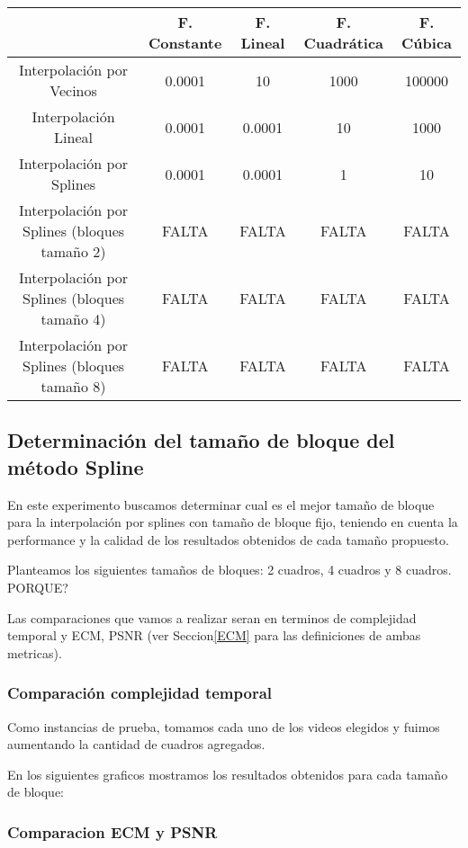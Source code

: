 \begin{table}[H]
    \begin{tabular}{| c | c | c | c | c |}
    \hline
    {} & F. Constante & F. Lineal & F. Cuadrática & F. Cúbica \\ \hline
    Interpolación por Vecinos & 0.0001 & 10 & 1000 & 100000 \\
    Interpolación Lineal & 0.0001 & 0.0001 & 10 & 1000 \\
    Interpolación por Splines & 0.0001 & 0.0001 & 1 & 10 \\
    Interpolación por Splines (bloques tamaño 2) & FALTA & FALTA & FALTA & FALTA \\
    Interpolación por Splines (bloques tamaño 4) & FALTA & FALTA & FALTA & FALTA \\
    Interpolación por Splines (bloques tamaño 8) & FALTA & FALTA & FALTA & FALTA \\
    \hline
    \end{tabular}
\end{table}

\subsection{Determinación del tamaño de bloque del método Spline}
En este experimento buscamos determinar cual es el mejor tamaño de bloque para la interpolación por splines con tamaño de bloque fijo, teniendo en cuenta la performance y la calidad de los resultados obtenidos de cada tamaño propuesto.

Planteamos los siguientes tamaños de bloques: 2 cuadros, 4 cuadros y 8 cuadros. PORQUE?

Las comparaciones que vamos a realizar seran en terminos de complejidad temporal y ECM, PSNR (ver Seccion\ref{ECM} para las definiciones de ambas metricas).
\subsubsection{Comparación complejidad temporal}
Como instancias de prueba, tomamos cada uno de los videos elegidos y fuimos aumentando la cantidad de cuadros agregados.

En los siguientes graficos mostramos los resultados obtenidos para cada tamaño de bloque:

\subsubsection{Comparacion ECM y PSNR}


